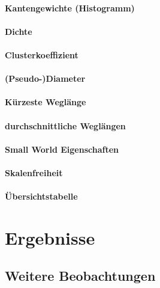 \documentclass[12pt]{article}
\begin{document}
\paragraph{Kantengewichte (Histogramm)}

\paragraph{Dichte}

\paragraph{Clusterkoeffizient}

\paragraph{(Pseudo-)Diameter}

\paragraph{K\"urzeste Wegl\"ange}

\paragraph{durchschnittliche Wegl\"angen}

\paragraph{Small World Eigenschaften}

\paragraph{Skalenfreiheit}

\paragraph{Übersichtstabelle}



\section{Ergebnisse}

\subsection{Weitere Beobachtungen}
\end{document}
